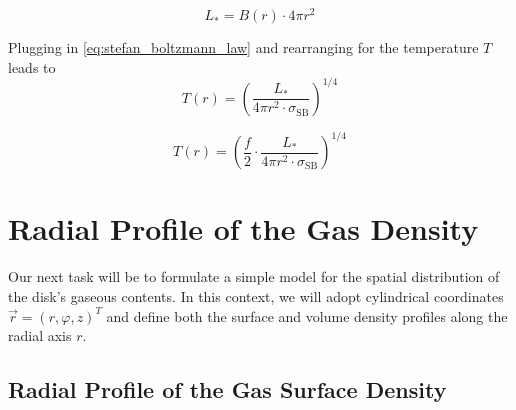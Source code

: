     \begin{equation}
        L_* = B(r) \cdot 4\pi r^2
    \end{equation}

    Plugging in \cref{eq:stefan_boltzmann_law} and rearranging for the temperature $T$ leads to
    \begin{equation}
        T(r) = \left(
            \frac{L_*}{4\pi r^2 \cdot \sigma_\text{SB}}
        \right)^{1/4}
    \end{equation}

    \begin{equation}
    \boxed{
        T(r) = \left(
            \frac{f}{2}\cdot
            \frac{L_*}{4\pi r^2 \cdot \sigma_\text{SB}}
        \right)^{1/4}
    }
    \end{equation}

    


\newpage\section{Radial Profile of the Gas Density}

    Our next task will be to formulate a simple model for the spatial distribution of the disk's 
    gaseous contents. In this context, we will adopt cylindrical coordinates 
    $\vec r=(r, \varphi, z)^T$ and define both the surface and volume density profiles along the 
    radial axis $r$.

    \subsection{Radial Profile of the Gas Surface Density}

